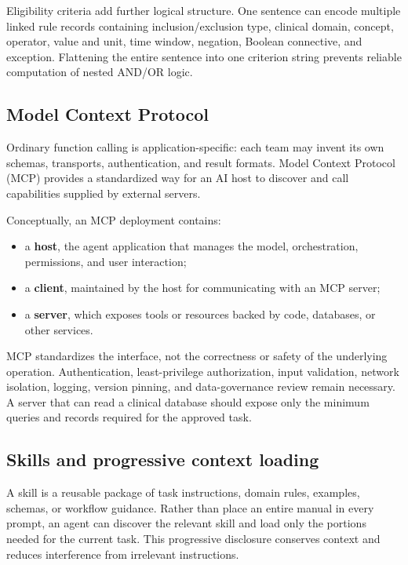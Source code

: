 \documentclass[12pt,oneside]{book}
\numberwithin{equation}{section}
\theoremstyle{definition}
\theoremstyle{plain}
\theoremstyle{remark}
\begin{document}
Eligibility criteria add further logical structure.  One sentence can encode
multiple linked rule records containing inclusion/exclusion type, clinical
domain, concept, operator, value and unit, time window, negation, Boolean
connective, and exception.  Flattening the entire sentence into one criterion
string prevents reliable computation of nested AND/OR logic.

\subsection{Model Context Protocol}

Ordinary function calling is application-specific: each team may invent its
own schemas, transports, authentication, and result formats.  Model Context
Protocol (MCP) provides a standardized way for an AI host to discover and call
capabilities supplied by external servers.

Conceptually, an MCP deployment contains:
\begin{itemize}
    \item a \textbf{host}, the agent application that manages the model,
    orchestration, permissions, and user interaction;
    \item a \textbf{client}, maintained by the host for communicating with an
    MCP server;
    \item a \textbf{server}, which exposes tools or resources backed by code,
    databases, or other services.
\end{itemize}
MCP standardizes the interface, not the correctness or safety of the underlying
operation.  Authentication, least-privilege authorization, input validation,
network isolation, logging, version pinning, and data-governance review remain
necessary.  A server that can read a clinical database should expose only the
minimum queries and records required for the approved task.

\subsection{Skills and progressive context loading}

A skill is a reusable package of task instructions, domain rules, examples,
schemas, or workflow guidance.  Rather than place an entire manual in every
prompt, an agent can discover the relevant skill and load only the portions
needed for the current task.  This progressive disclosure conserves context and
reduces interference from irrelevant instructions.
\end{document}
